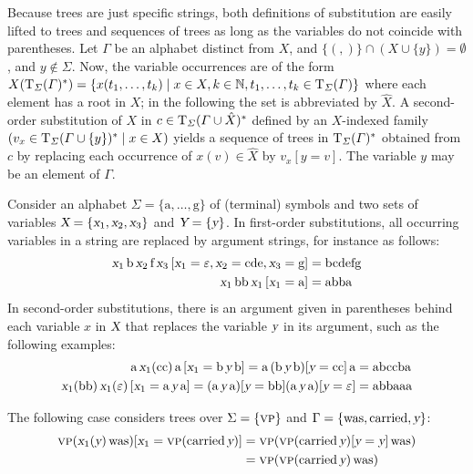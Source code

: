 \documentclass[../document.tex]{subfiles}
\begin{document}
    Because trees are just specific strings, both definitions of substitution are easily lifted to trees and sequences of trees as long as the variables do not coincide with parentheses.
    Let \(\varGamma\) be an alphabet distinct from \(X\), and \(\{ (, ) \} \cap (X \cup \{y\}) = \emptyset\), and \(y \notin \varSigma\).
    Now, the variable occurrences are of the form \(X(\operatorname{T}_\varSigma(\varGamma)^*) = \{x(t_1, \ldots, t_k) \mid x \in X, k \in \mathbb{N}, t_1, \ldots, t_k \in \operatorname{T}_{\varSigma}(\varGamma)\}\) where each element has a root in \(X\); in the following the set is abbreviated by \(\hat{X}\).
    A second-order substitution of \(X\) in \(c \in \operatorname{T}_\varSigma(\varGamma \cup \hat{X})^*\) defined by an \(X\)-indexed family \((v_x \in \operatorname{T}_\varSigma(\varGamma \cup \{y\})^* \mid x \in X)\) yields a sequence of trees in \(\operatorname{T}_\varSigma(\varGamma)^*\) obtained from \(c\) by replacing each occurrence of \(x(v) \in \hat{X}\) by \(v_x[y=v]\).
    The variable \(y\) may be an element of \(\varGamma\).

    \begin{example}
        Consider an alphabet \(\Sigma = \{\text{a}, \ldots, \text{g}\}\) of (terminal) symbols and two sets of variables \(\textsl{X} = \{\textsl{x}_1, \textsl{x}_2, \textsl{x}_3\}\) and \(\textsl{Y} = \{\textsl{y}\}\).
        In first-order substitutions, all occurring variables in a string are replaced by argument strings, for instance as follows:
        \begin{align*}
            \textsl{x}_1 \, \text{b} \, \textsl{x}_2 \, \text{f} \, \textsl{x}_3\,[\textsl{x}_1=\varepsilon, \textsl{x}_2=\text{cde}, \textsl{x}_3=\text{g}] &= \text{bcdefg} \\
            \textsl{x}_1 \, \text{bb} \, \textsl{x}_1 \, [\textsl{x}_1=\text{a}] &= \text{abba}
        \end{align*}
        In second-order substitutions, there is an argument given in parentheses behind each variable \(x\) in \(\textsl{X}\) that replaces the variable \(\textsl{y}\) in its argument, such as the following examples:
        \begin{align*}
            \text{a} \, \textsl{x}_1(\text{cc}) \, \text{a} \, [\textsl{x}_1=\text{b}\,\textsl{y}\,\text{b}] = \text{a} \, (\text{b}\,\textsl{y}\,\text{b})[\textsl{y}=\text{cc}] \, \text{a} &= \text{abccba} \\
            \textsl{x}_1(\text{bb}) \, \textsl{x}_1(\varepsilon) \, [\textsl{x}_1=\text{a}\,\textsl{y}\,\text{a}] = (\text{a}\,\textsl{y}\,\text{a})[\textsl{y}=\text{bb}] (\text{a}\,\textsl{y}\,\text{a})[\textsl{y}=\varepsilon] &= \text{abbaaa}
        \end{align*}

        The following case considers trees over \(\Sigma=\{\textsc{vp}\}\) and \(\Gamma=\{\text{was}, \text{carried}, \textsl{y}\}\):
        \begin{align*}
            \textsc{vp}( \textsl{x}_1(\textsl{y}) \, \text{was} )[\textsl{x}_1=\textsc{vp}(\text{carried}\,\textsl{y})]
                &= \textsc{vp}( \textsc{vp}(\text{carried}\,\textsl{y})[\textsl{y}=\textsl{y}] \, \text{was} ) \\
                &= \textsc{vp}(\textsc{vp}(\text{carried}\,\textsl{y})\,\text{was})
        \end{align*}
    \end{example}
\end{document}
